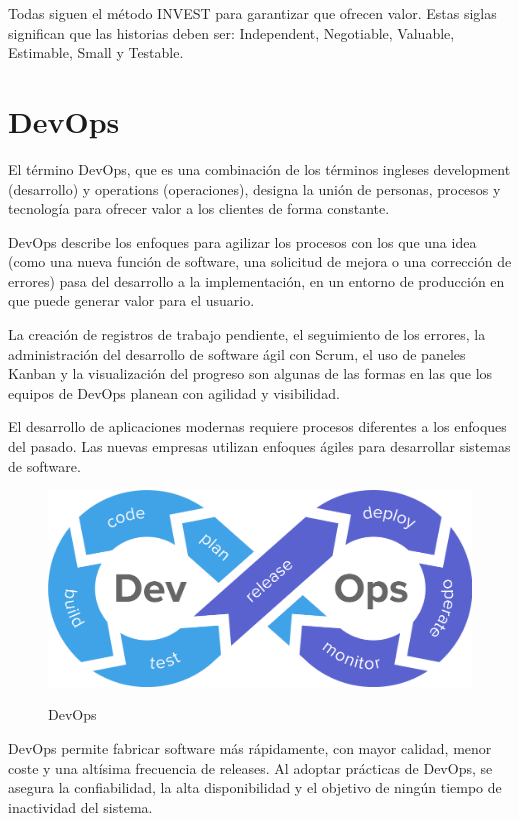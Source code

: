 \documentclass[12pt,twoside,titlepage]{report}
\begin{document}
Todas siguen el método INVEST para garantizar que ofrecen valor. Estas siglas significan que las historias deben ser: Independent, Negotiable, Valuable, Estimable, Small y Testable.

\section{DevOps}

El término DevOps, que es una combinación de los términos ingleses development (desarrollo) y operations (operaciones), designa la unión de personas, procesos y tecnología para ofrecer valor a los clientes de forma constante.

DevOps describe los enfoques para agilizar los procesos con los que una idea (como una nueva función de software, una solicitud de mejora o una corrección de errores) pasa del desarrollo a la implementación, en un entorno de producción en que puede generar valor para el usuario.

La creación de registros de trabajo pendiente, el seguimiento de los errores, la administración del desarrollo de software ágil con Scrum, el uso de paneles Kanban y la visualización del progreso son algunas de las formas en las que los equipos de DevOps planean con agilidad y visibilidad.

El desarrollo de aplicaciones modernas requiere procesos diferentes a los enfoques del pasado. Las nuevas empresas utilizan enfoques ágiles para desarrollar sistemas de software.

\begin{figure}[H]
    \centering
    \includegraphics[scale=0.24]{DevOps/DevOps}
    \label{fig:DevOps}
    \caption{DevOps}
\end{figure}

DevOps permite fabricar software más rápidamente, con mayor calidad, menor coste y una altísima frecuencia de releases. Al adoptar prácticas de DevOps, se asegura la confiabilidad, la alta disponibilidad y el objetivo de ningún tiempo de inactividad del sistema.
\end{document}
